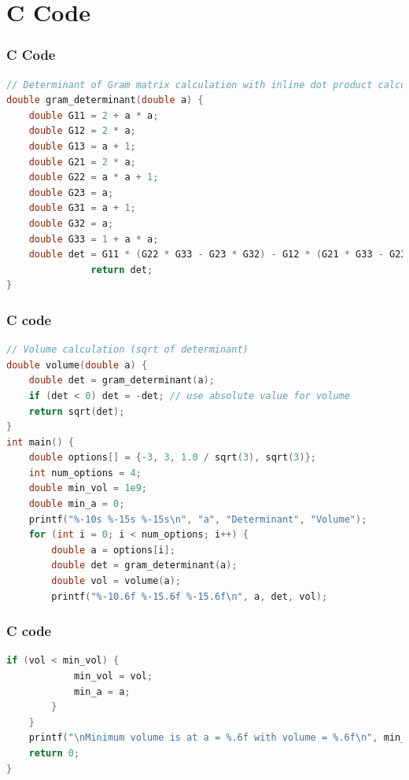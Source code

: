 \documentclass{beamer}
\theoremstyle{remark}
\numberwithin{equation}{section}
\begin{document}
\section{C Code}
\begin{frame}[fragile]
\frametitle{C Code}
\begin{lstlisting}[language=C]
// Determinant of Gram matrix calculation with inline dot product calculations
double gram_determinant(double a) {
    double G11 = 2 + a * a;
    double G12 = 2 * a;
    double G13 = a + 1;
    double G21 = 2 * a;
    double G22 = a * a + 1;
    double G23 = a;
    double G31 = a + 1;
    double G32 = a;
    double G33 = 1 + a * a;
    double det = G11 * (G22 * G33 - G23 * G32) - G12 * (G21 * G33 - G23 * G31)+ G13 * (G21 * G32 - G22 * G31);
               return det;
}

    \end{lstlisting}
\end{frame}
\begin{frame}[fragile]
    \frametitle{C code}
    \begin{lstlisting}[language=C]
        // Volume calculation (sqrt of determinant)
double volume(double a) {
    double det = gram_determinant(a);
    if (det < 0) det = -det; // use absolute value for volume
    return sqrt(det);
}
int main() {
    double options[] = {-3, 3, 1.0 / sqrt(3), sqrt(3)};
    int num_options = 4;
    double min_vol = 1e9;
    double min_a = 0;
    printf("%-10s %-15s %-15s\n", "a", "Determinant", "Volume");
    for (int i = 0; i < num_options; i++) {
        double a = options[i];
        double det = gram_determinant(a);
        double vol = volume(a);
        printf("%-10.6f %-15.6f %-15.6f\n", a, det, vol);

    \end{lstlisting}
\end{frame}
\begin{frame}[fragile]
    \frametitle{C code}
    \begin{lstlisting}[language=C]
if (vol < min_vol) {
            min_vol = vol;
            min_a = a;
        }
    }
    printf("\nMinimum volume is at a = %.6f with volume = %.6f\n", min_a, min_vol);
    return 0;
}
     \end{lstlisting}
\end{frame}
\end{document}
